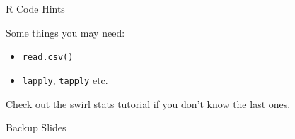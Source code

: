 \documentclass{beamer}
\begin{document}
\begin{frame}{R Code Hints}

Some things you may need:
\begin{itemize}
\item \texttt{read.csv()}
\item \texttt{lapply}, \texttt{tapply} etc.
\end{itemize}

\vspace{5mm}

Check out the swirl stats tutorial if you don't know the last ones.

\end{frame}



\appendix
{}
\setcounter{finalframe}{\value{framenumber}}

\begin{frame}{Backup Slides}
\end{frame}




\setcounter{framenumber}{\value{finalframe}}
\end{document}
